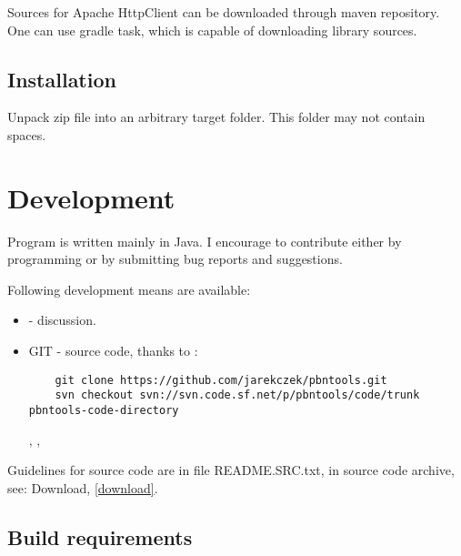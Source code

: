 \documentclass[polish,a4paper,11pt,oneside]{article}
\begin{document}
Sources for Apache HttpClient can be downloaded through maven repository.
One can use gradle task, which is capable of downloading library sources.

\subsection{Installation}
Unpack zip file into an arbitrary target folder.
This folder may not contain spaces.

\section{Development} \label{dev}

Program is written mainly in Java.
I encourage to contribute either by programming or by submitting bug reports and suggestions.

Following development means are available:

\begin{itemize}
\item
   -
  discussion.
  
\item
  GIT - source code, thanks to 
  :
  \begin{verbatim}
    git clone https://github.com/jarekczek/pbntools.git
    svn checkout svn://svn.code.sf.net/p/pbntools/code/trunk pbntools-code-directory
  \end{verbatim}

  ,
  , 

\end{itemize}

Guidelines for source code are in file README.SRC.txt,
in source code archive, see: Download, \ref{download}.

\subsection{Build requirements}
\end{document}

